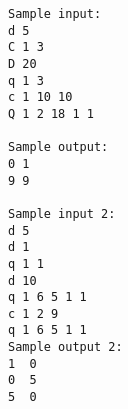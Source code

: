 \begin{verbatim}
Sample input: 
d 5 
C 1 3 
D 20 
q 1 3 
c 1 10 10 
Q 1 2 18 1 1 

Sample output: 
0 1 
9 9  

Sample input 2:
d 5
d 1
q 1 1
d 10
q 1 6 5 1 1
c 1 2 9
q 1 6 5 1 1
Sample output 2:
1  0
0  5
5  0
\end{verbatim}